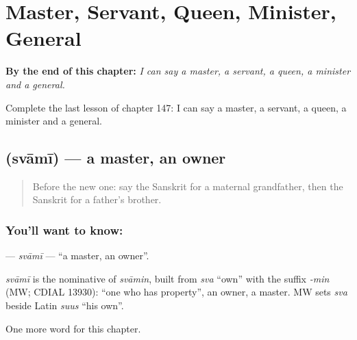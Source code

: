 
\chapter{Master, Servant, Queen, Minister, General}
\label{ch:sa-master-servant-queen-minister-general}

\begin{chapteropening}
\textbf{By the end of this chapter:} \emph{I can say a master, a servant, a queen, a minister and a general.}

Complete the last lesson of chapter 147: I can say a master, a servant, a queen, a minister and a general.
\end{chapteropening}

\section[\texorpdfstring{\sk{स्वामी} (svāmī)}{स्वामी (svāmī)}]{ (svāmī) — a master, an owner}

\label{lesson:SA-C147-svami}



\begin{quote}
Before the new one: say the Sanskrit for a maternal grandfather, then the Sanskrit for a father's brother.
\end{quote}

\subsection*{You'll want to know: }
\textbf{} — \emph{svāmī} — \textquotedblleft{}a master, an owner\textquotedblright{}.

\begin{cousinweb}
\emph{svāmī} is the nominative of \emph{svāmin}, built from \emph{sva} \textquotedblleft{}own\textquotedblright{} with the suffix \emph{-min} (MW; CDIAL 13930): \textquotedblleft{}one who has property\textquotedblright{}, an owner, a master. MW sets \emph{sva} beside Latin \emph{suus} \textquotedblleft{}his own\textquotedblright{}.
\end{cousinweb}

\begin{grammarlens}[title={What you've built}]
One more word for this chapter.
\end{grammarlens}


